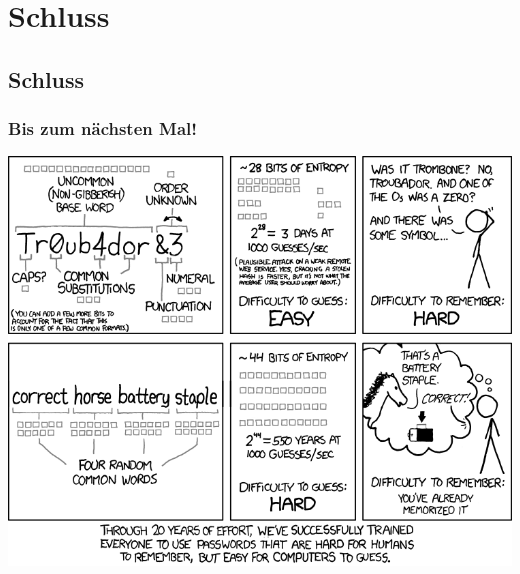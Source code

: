 \section{Schluss}
\subsection{Schluss}

\begin{frame}
\frametitle{Bis zum nächsten Mal!}
\begin{center}
  \includegraphics[width=1 \textheight]{images/password_strength.png}
\end{center}
\end{frame}

